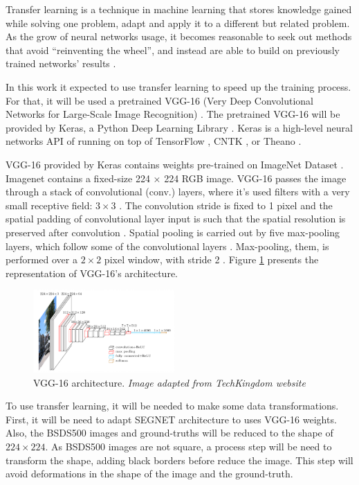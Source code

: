 \documentclass[10pt,twocolumn,letterpaper]{article}
\begin{document}
Transfer learning is a technique in machine learning that stores knowledge gained while solving one problem, adapt and apply it to a different but related problem. As the grow of neural networks usage, it becomes reasonable to seek out methods that avoid ``reinventing the wheel'', and instead are able to build on previously trained networks' results \cite{PRATT} \cite{WEISS2016}.

In this work it expected to use transfer learning to speed up the training process. For that, it will be used a pretrained VGG-16 (Very Deep Convolutional Networks for Large-Scale Image Recognition) \cite{VGGNET}. The pretrained VGG-16 will be provided by Keras, a Python Deep Learning Library \cite{KERAS}. Keras is a high-level neural networks API of running on top of TensorFlow \cite{TENSORFLOW}, CNTK \cite{CNTK}, or Theano \cite{THEANO} \cite{KERAS}.

VGG-16 provided by Keras contains weights pre-trained on ImageNet Dataset \cite{IMAGENET}. Imagenet contains a fixed-size 224 × 224 RGB image. VGG-16 passes the image through a stack of convolutional (conv.) layers, where it's used filters with a very small receptive field: $3 \times 3$ \cite{VGGNET}. The convolution stride is fixed to 1 pixel and the spatial padding of convolutional layer input is such that the spatial resolution is preserved after convolution \cite{VGGNET}. Spatial pooling is carried out by five max-pooling layers, which follow some of the convolutional layers \cite{VGGNET}. Max-pooling, them, is performed over a $2 \times 2$ pixel window, with stride 2 \cite{VGGNET}. Figure \ref{fig:vgg16} presents the representation of VGG-16's architecture.

\begin{figure}[ht]
  \centering
  \includegraphics[width=0.48\textwidth]{vgg16.png}
  \caption{VGG-16 architecture. \textit{Image adapted from TechKingdom website\cite{VGG16_IMG}}}
  \label{fig:vgg16}
\end{figure}

To use transfer learning, it will be needed to make some data transformations. First, it will be need to adapt SEGNET architecture to uses VGG-16 weights. Also, the BSDS500 images and ground-truths will be reduced to the shape of $ 224 \times 224$. As BSDS500 images are not square, a process step will be need to transform the shape, adding black borders before reduce the image. This step will avoid deformations in the shape of the image and the ground-truth.
\end{document}
